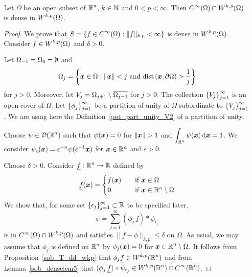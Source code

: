 \begin{theorem} \label{sob_Cinfty_dense}
Let $\Omega$ be an open subset of $\displaystyle \mathbb{R}^n$, $k\in \mathbb{N}$
and $0<p<\infty$.
Then $\displaystyle C^\infty(\Omega) \cap W^{k,p}(\Omega)$ is dense in
$\displaystyle W^{k,p}(\Omega)$.
\end{theorem}

\begin{proof}
We prove that
$\displaystyle
S = \left\{ f \in C^\infty(\Omega) :  \|f\|_{k,p} < \infty \right\}$
is dense in $\displaystyle W^{k,p}(\Omega)$.  Consider
$\displaystyle f\in W^{k,p}(\Omega)$ and $\delta>0$.

 Let $\displaystyle \Omega_{-1} = \Omega_0 = \emptyset$ and
\[
\Omega_j = \left\{ \VEC{x} \in \Omega : \|\VEC{x}\| < j \ \text{and} \ 
\dist{\VEC{x}}{\partial \Omega} > \frac{1}{j} \right\}
\]
for $j>0$.  Moreover, let
$\displaystyle V_j = \Omega_{j+1} \setminus \overline{\Omega_{j-1}}$
for $j>0$.
The collection $\displaystyle \left\{ V_j \right\}_{j=1}^\infty$ is an
open cover of $\Omega$.  Let
$\displaystyle \left\{ \phi_j \right\}_{j=1}^\infty$ be a partition
of unity of $\Omega$ subordinate to
$\displaystyle \left\{ V_j \right\}_{j=1}^\infty$.  We are using here
the Definition~\ref{pot_part_unity_V2} of a partition of unity.

Choose $\displaystyle \psi \in \mathcal{D}(\mathbb{R}^n)$ such that
$\psi({\bm{x}}) = 0$ for $\|\VEC{x}\|>1$ and
$\displaystyle \int_{\mathbb{R}^n} \psi({\bm{x}}) \,\mathrm{d}{{\bm{x}}} = 1$.
We consider
$\displaystyle \psi_\epsilon({\bm{x}}) = \epsilon^{-n}
\psi(\epsilon^{-1} {\bm{x}})$ for ${\bm{x}} \in \mathbb{R}^n$ and $\epsilon>0$.

 Choose $\delta >0$.  Consider
$\displaystyle \underline{f}: \mathbb{R}^n \to \mathbb{R}$ defined by
\[
\underline{f}({\bm{x}}) =
\begin{cases}
f({\bm{x}}) & \quad \text{if} \ {\bm{x}} \in \Omega \\
0 & \quad \text{if} \ {\bm{x}} \in \mathbb{R}^n \setminus \Omega
\end{cases}
\]
We show that, for some set
$\displaystyle \{\epsilon_j\}_{j=1}^\infty \subset \mathbb{R}$ to be
specified later,
\begin{equation} \label{sob_HequalsW_phi}
\phi = \sum_{j=1}^\infty (\phi_j\,\underline{f}) \ast \psi_{\epsilon_j}
\end{equation}
is in $\displaystyle C^\infty(\Omega) \cap W^{k,p}(\Omega)$ and satisfies
$\|f-\phi\|_{k,p} \leq \delta$ on $\Omega$.  As usual, we may assume
that $\phi_j$ is defined on $\displaystyle \mathbb{R}^n$ by $\phi_j({\bm{x}}) = 0$ for
$\displaystyle {\bm{x}} \in \mathbb{R}^n\setminus \Omega$.
It follows from Proposition~\ref{sob_T_dd_wkp} that
$\displaystyle \phi_j \underline{f} \in W^{k,p}(\mathbb{R}^n)$ and from
Lemma~\ref{sob_denselem5} that
$\displaystyle (\phi_j\,\underline{f}) \ast \psi_{\epsilon_j} \in
W^{k,p}(\mathbb{R}^n) \cap C^\infty(\mathbb{R}^n)$.


\end{proof}
